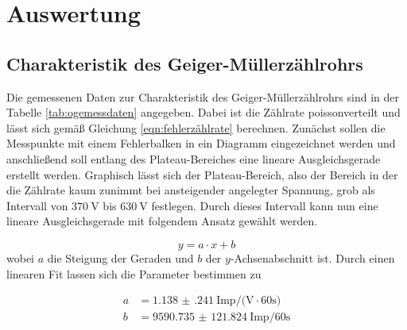 \section{Auswertung}

\subsection{Charakteristik des Geiger-Müllerzählrohrs}
\label{sec:charakteristik}

Die gemessenen Daten zur Charakteristik des Geiger-Müllerzählrohrs sind in der Tabelle \ref{tab:ogemessdaten}
angegeben. Dabei ist die Zählrate poissonverteilt und lässt sich gemäß Gleichung \ref{eqn:fehlerzählrate} berechnen.
\newline
Zunächst sollen die Messpunkte mit einem Fehlerbalken in ein Diagramm eingezeichnet werden und anschließend soll entlang des Plateau-Bereiches
eine lineare Ausgleichsgerade erstellt werden. Graphisch lässt sich der Plateau-Bereich, also der Bereich in der die Zählrate kaum zunimmt bei ansteigender angelegter Spannung, grob
als Intervall von $\SI{370}{\volt}$ bis $\SI{630}{\volt}$ festlegen. Durch dieses Intervall kann nun eine lineare Ausgleichsgerade mit folgendem Ansatz gewählt werden.

\begin{equation*}
y = a \cdot x + b
\end{equation*}
wobei $a$ die Steigung der Geraden und $b$ der $y$-Achsenabschnitt ist.
Durch einen linearen Fit lassen sich die Parameter bestimmen zu

\begin{align}
\label{eqn:Param}
a &= \SI{1.138(241)}{{\text{Imp}}\per(\volt\cdot{60}\second)} \\
\label{eqn:Param2}
b &= \SI{9590.735(121824)}{{\text{Imp}}\per{60}\second}
\end{align}

